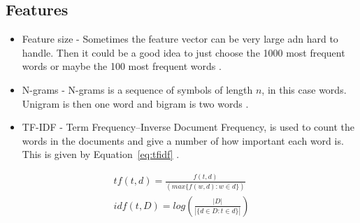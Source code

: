 \subsection{Features}
\begin{itemize}
\item Feature size - Sometimes the feature vector can be very large adn hard to
        handle. Then it could be a good idea to just choose the 1000 most
        frequent words or maybe the 100 most frequent words \citep{joachims}.
\item N-grams - N-grams is a sequence of symbols of length $n$, in this case
        words. Unigram is then one word and bigram is two words \citep{ngrams_ai}.
\item TF-IDF - Term Frequency–Inverse Document Frequency, is used to count the
        words in the documents and give a number of how important each word is.
        This is given by Equation~\ref{eq:tfidf} \citep{tfidf}.
\end{itemize}

\begin{equation}
\begin{array}{l}
tf(t,d) = \frac{f(t,d)}{(max \{f(w,d) : w \in d\})} \\
idf(t,D) = log(\frac{|D|}{|\{d \in D : t \in d\}|})
\end{array}
\label{eq:tfidf}
\end{equation}

